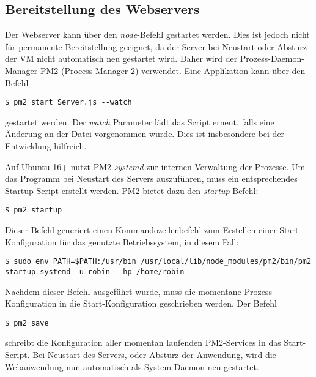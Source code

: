 \subsection{Bereitstellung des Webservers}
Der Webserver kann über den \textit{node}-Befehl gestartet werden. Dies ist jedoch nicht für permanente Bereitstellung geeignet, da der Server bei Neustart oder Absturz der \acs{VM} nicht automatisch neu gestartet wird. Daher wird der Prozess-Daemon-Manager \glqq{}PM2\grqq{} (Process Manager 2) verwendet. Eine Applikation kann über den Befehl
\lstset{style=STYLE_COMMAND_LINE_ARGUMENT_SINGLE_LINE}
\begin{lstlisting}[belowskip=-0.8 \baselineskip]
$ pm2 start Server.js --watch
\end{lstlisting}
gestartet werden. Der \textit{watch} Parameter lädt das Script erneut, falls eine Änderung an der Datei vorgenommen wurde. Dies ist insbesondere bei der Entwicklung hilfreich.\par

Auf Ubuntu 16+ nutzt PM2 \textit{systemd} zur internen Verwaltung der Prozesse. Um das Programm bei Neustart des Servers auszuführen, muss ein entsprechendes \glqq{}Startup-Script\grqq{} erstellt werden. PM2 bietet dazu den \textit{startup}-Befehl:
\lstset{style=STYLE_COMMAND_LINE_ARGUMENT_SINGLE_LINE}
\begin{lstlisting}[belowskip=-0.8 \baselineskip]
$ pm2 startup
\end{lstlisting}
Dieser Befehl generiert einen Kommandozeilenbefehl zum Erstellen einer Start-Konfiguration für das genutzte Betriebssystem, in diesem Fall:
\lstset{style=STYLE_COMMAND_LINE_ARGUMENT_SINGLE_LINE}
\begin{lstlisting}[belowskip=-0.8 \baselineskip]
$ sudo env PATH=$PATH:/usr/bin /usr/local/lib/node_modules/pm2/bin/pm2 startup systemd -u robin --hp /home/robin
\end{lstlisting}
Nachdem dieser Befehl ausgeführt wurde, muss die momentane Prozess-Konfiguration in die Start-Konfiguration geschrieben werden. Der Befehl 
\lstset{style=STYLE_COMMAND_LINE_ARGUMENT_SINGLE_LINE}
\begin{lstlisting}[belowskip=-0.8 \baselineskip]
$ pm2 save
\end{lstlisting}
schreibt die Konfiguration aller momentan laufenden PM2-Services in das Start-Script. Bei Neustart des Servers, oder Absturz der Anwendung, wird die Webanwendung nun automatisch als System-Daemon neu gestartet.